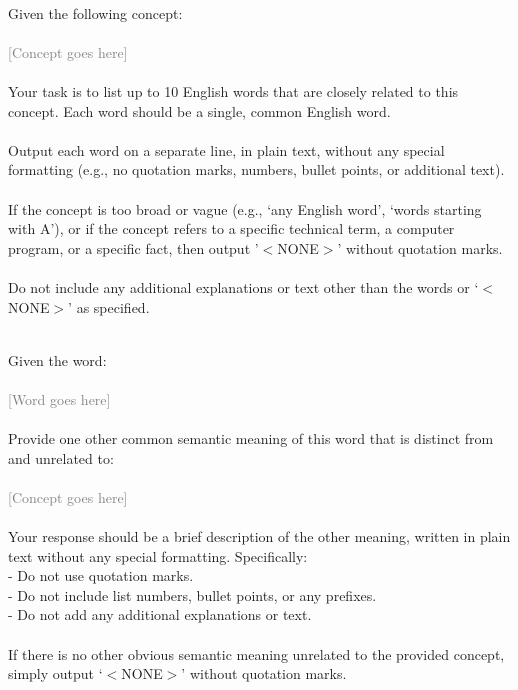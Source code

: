 \begin{tcolorbox}[title=List words related to the concept]
\quad \\
\small 
Given the following concept: \\ \\ \textcolor{gray}{[Concept goes here]} \\ \\ Your task is to list up to 10 English words that are closely related to this concept. Each word should be a single, common English word. \\ \\ Output each word on a separate line, in plain text, without any special formatting (e.g., no quotation marks, numbers, bullet points, or additional text). \\ \\ If the concept is too broad or vague (e.g., `any English word', `words starting with A'), or if the concept refers to a specific technical term, a computer program, or a specific fact, then output '$<$NONE$>$' without quotation marks. \\ \\ Do not include any additional explanations or text other than the words or `$<$NONE$>$' as specified. \\
\end{tcolorbox}

\begin{tcolorbox}[title=Find alternative senses of a word]
\quad \\
\small 
Given the word: \\ \\ \textcolor{gray}{[Word goes here]} \\ \\ Provide one other common semantic meaning of this word that is distinct from and unrelated to: \\ \\ \textcolor{gray}{[Concept goes here]} \\ \\ Your response should be a brief description of the other meaning, written in plain text without any special formatting. Specifically: \\
- Do not use quotation marks. \\
- Do not include list numbers, bullet points, or any prefixes. \\
- Do not add any additional explanations or text. \\ \\ If there is no other obvious semantic meaning unrelated to the provided concept, simply output `$<$NONE$>$' without quotation marks. \\
\end{tcolorbox}

